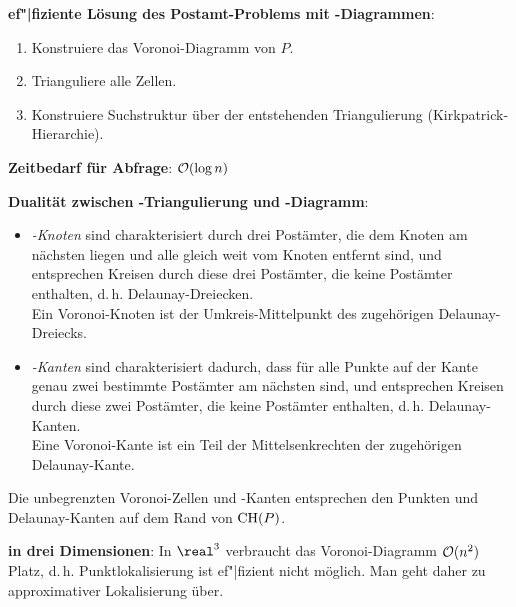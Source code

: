 \textbf{ef"|fiziente Lösung des Postamt-Problems mit -Diagrammen}:
\begin{enumerate}
    \item
    Konstruiere das Voronoi-Diagramm von $P$.

    \item
    Trianguliere alle Zellen.

    \item
    Konstruiere Suchstruktur über der entstehenden Triangulierung (Kirkpatrick-Hierarchie).
\end{enumerate}

\textbf{Zeitbedarf für Abfrage}:
$\mathcal{O}(\log n)$

\linie

\textbf{Dualität zwischen -Triangulierung und -Diagramm}:
\begin{itemize}
    \item
    \emph{-Knoten}
    sind charakterisiert durch drei Postämter, die dem Knoten am nächsten liegen
    und alle gleich weit vom Knoten entfernt sind,
    und entsprechen Kreisen durch diese drei Postämter, die keine Postämter enthalten,
    d.\,h. Delaunay-Dreiecken.\\
    Ein Voronoi-Knoten ist der Umkreis-Mittelpunkt des zugehörigen Delaunay-Dreiecks.

    \item
    \emph{-Kanten}
    sind charakterisiert dadurch, dass für alle Punkte auf der Kante genau zwei bestimmte
    Postämter am nächsten sind,
    und entsprechen Kreisen durch diese zwei Postämter, die keine Postämter enthalten,
    d.\,h. Delaunay-Kanten.\\
    Eine Voronoi-Kante ist ein Teil der Mittelsenkrechten der zugehörigen Delaunay-Kante.
\end{itemize}
Die unbegrenzten Voronoi-Zellen und -Kanten entsprechen den Punkten und Delaunay-Kanten
auf dem Rand von $\operatorname{CH}(P)$.

\linie

\textbf{in drei Dimensionen}:
In $\real^3$ verbraucht das Voronoi-Diagramm $\mathcal{O}(n^2)$ Platz, d.\,h. Punktlokalisierung ist
ef"|fizient nicht möglich.
Man geht daher zu approximativer Lokalisierung über.

\linie

